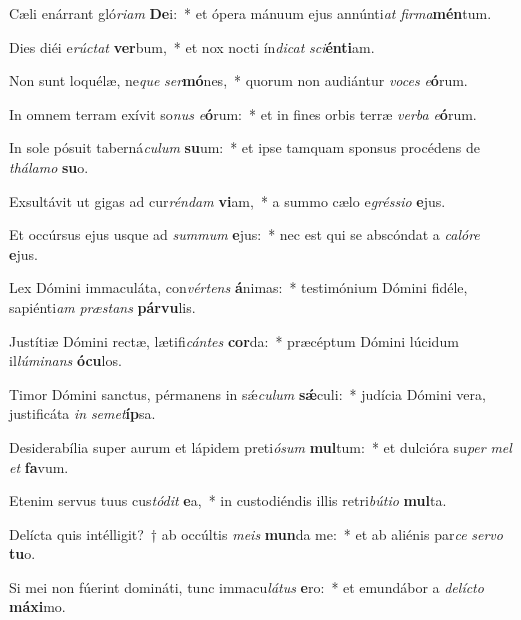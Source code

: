 \item Cæli enárrant gló\textit{ri}\textit{am} \textbf{De}i:~* et ópera mánuum ejus annúnti\textit{at} \textit{fir}\textit{ma}\textbf{mén}tum.
\item Dies diéi e\textit{rúc}\textit{tat} \textbf{ver}bum,~* et nox nocti ín\textit{di}\textit{cat} \textit{sci}\textbf{én}\textbf{ti}am.
\item Non sunt loquélæ, ne\textit{que} \textit{ser}\textbf{mó}nes,~* quorum non audiántur \textit{vo}\textit{ces} \textit{e}\textbf{ó}rum.
\item In omnem terram exívit so\textit{nus} \textit{e}\textbf{ó}rum:~* et in fines orbis terræ \textit{ver}\textit{ba} \textit{e}\textbf{ó}rum.
\item In sole pósuit taberná\textit{cu}\textit{lum} \textbf{su}um:~* et ipse tamquam sponsus procédens de \textit{thá}\textit{la}\textit{mo} \textbf{su}o.
\item Exsultávit ut gigas ad cur\textit{rén}\textit{dam} \textbf{vi}am,~* a summo cælo e\textit{grés}\textit{si}\textit{o} \textbf{e}jus.
\item Et occúrsus ejus usque ad \textit{sum}\textit{mum} \textbf{e}jus:~* nec est qui se abscóndat a \textit{ca}\textit{ló}\textit{re} \textbf{e}jus.
\item Lex Dómini immaculáta, con\textit{vér}\textit{tens} \textbf{á}nimas:~* testimónium Dómini fidéle, sapiénti\textit{am} \textit{præ}\textit{stans} \textbf{pár}\textbf{vu}lis.
\item Justítiæ Dómini rectæ, lætifi\textit{cán}\textit{tes} \textbf{cor}da:~* præcéptum Dómini lúcidum il\textit{lú}\textit{mi}\textit{nans} \textbf{ó}\textbf{cu}los.
\item Timor Dómini sanctus, pérmanens in sǽ\textit{cu}\textit{lum} \textbf{sǽ}culi:~* judícia Dómini vera, justificáta \textit{in} \textit{se}\textit{met}\textbf{íp}sa.
\item Desiderabília super aurum et lápidem preti\textit{ó}\textit{sum} \textbf{mul}tum:~* et dulcióra su\textit{per} \textit{mel} \textit{et} \textbf{fa}vum.
\item Etenim servus tuus cus\textit{tó}\textit{dit} \textbf{e}a,~* in custodiéndis illis retri\textit{bú}\textit{ti}\textit{o} \textbf{mul}ta.
\item Delícta quis intélligit?~† ab occúltis \textit{me}\textit{is} \textbf{mun}da me:~* et ab aliénis par\textit{ce} \textit{ser}\textit{vo} \textbf{tu}o.
\item Si mei non fúerint domináti, tunc immacu\textit{lá}\textit{tus} \textbf{e}ro:~* et emundábor a \textit{de}\textit{líc}\textit{to} \textbf{má}\textbf{xi}mo.
